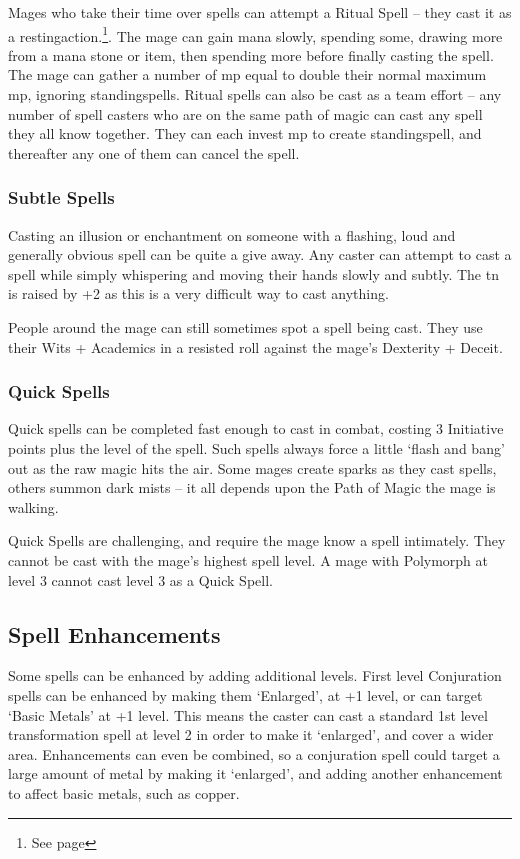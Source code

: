 \begin{multicols}{2}
Mages who take their time over spells can attempt a Ritual Spell -- they cast it as a \gls{restingaction}.\footnote{See page \pageref{restingactions}}.
The mage can gain mana slowly, spending some, drawing more from a mana stone or item, then spending more before finally casting the spell.
The mage can gather a number of \gls{mp} equal to double their normal maximum \gls{mp}, ignoring \glspl{standingspell}.
Ritual spells can also be cast as a team effort -- any number of spell casters who are on the same \gls{path} of magic can cast any spell they all know together.
They can each invest \gls{mp} to create \gls{standingspell}, and thereafter any one of them can cancel the spell.

\subsubsection{Subtle Spells}

Casting an illusion or enchantment on someone with a flashing, loud and generally obvious spell can be quite a give away. Any caster can attempt to cast a spell while simply whispering and moving their hands slowly and subtly.  The \gls{tn} is raised by +2 as this is a very difficult way to cast anything.

People around the mage can still sometimes spot a spell being cast. They use their Wits + Academics in a resisted roll against the mage's Dexterity + Deceit.

\subsubsection{Quick Spells}

Quick spells can be completed fast enough to cast in combat, costing 3 Initiative points plus the level of the spell.
Such spells always force a little `flash and bang' out as the raw magic hits the air.
Some mages create sparks as they cast spells, others summon dark mists -- it all depends upon the Path of Magic the mage is walking.

Quick Spells are challenging, and require the mage know a spell intimately.  They cannot be cast with the mage's highest spell level.  A mage with Polymorph at level 3 cannot cast level 3 as a Quick Spell.

\subsection{Spell Enhancements}

Some spells can be enhanced by adding additional levels.
 First level Conjuration spells can be enhanced by making them `Enlarged', at +1 level, or can target `Basic Metals' at +1 level.
This means the caster can cast a standard 1st level transformation spell at level 2 in order to make it `enlarged', and cover a wider area.
Enhancements can even be combined, so a conjuration spell could target a large amount of metal by making it `enlarged', and adding another enhancement to affect basic metals, such as copper.


\end{multicols}

